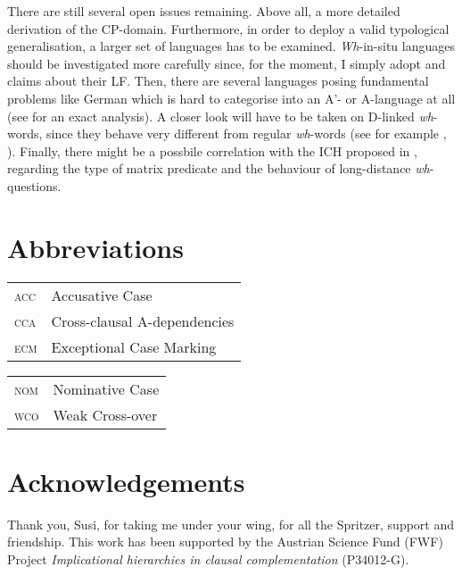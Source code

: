 \documentclass[output=paper,colorlinks,citecolor=brown]{langscibook}
\begin{document}
There are still several open issues remaining. Above all, a more detailed derivation of the CP-domain. Furthermore, in order to deploy a valid typological generalisation, a larger set of languages has to be examined. \textit{Wh}-in-situ languages should be investigated more carefully since, for the moment, I simply adopt  and  claims about their LF. Then, there are several languages posing fundamental problems like German which is hard to categorise into an A'- or A-language at all (see \citealp{wiltschko1997d} for an exact analysis). A closer look will have to be taken on D-linked \textit{wh}-words, since they behave very different from regular \textit{wh}-words (see for example \citealp{pesetsky1987wh}, \citealp{krapova1999subjunctive}). Finally, there might be a possbile correlation with the ICH proposed in \citet{WurmbrandLohningerToAppear}, regarding the type of matrix predicate and the behaviour of long-distance \textit{wh}-questions. 


\section*{Abbreviations}
\begin{tabularx}{.5\textwidth}[t]{@{}lQ}
\textsc{acc} & Accusative Case              \\
\textsc{cca} & Cross-clausal A-dependencies\\
\textsc{ecm} & Exceptional Case Marking   \\    
\end{tabularx}\begin{tabularx}{.5\textwidth}[t]{lQ@{}}
\textsc{nom} & Nominative Case \\
\textsc{wco} & Weak Cross-over \\
\end{tabularx}



\section*{Acknowledgements}
Thank you, Susi, for taking me under your wing, for all the Spritzer, support and friendship.
This work has been supported by the Austrian Science Fund (FWF) Project \textit{Implicational hierarchies in clausal complementation} (P34012-G).

\printbibliography[heading=subbibliography,notkeyword=this]
\end{document}
